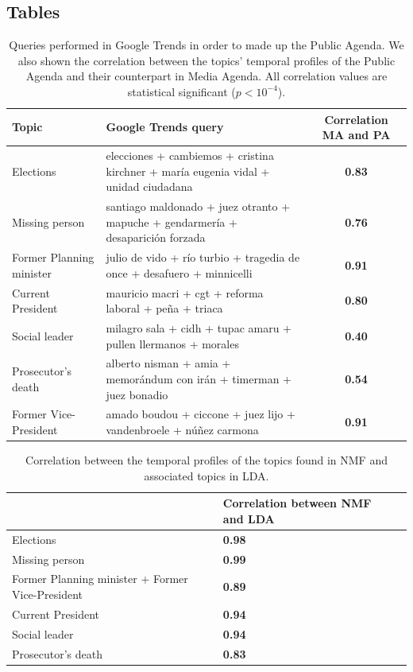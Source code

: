 \documentclass{bmcart}
\begin{document}
\begin{backmatter}
\section*{Tables}
\begin{table}[h!]
\caption{Queries performed in Google Trends in order to made up the Public Agenda.
We also shown the correlation between the topics' temporal profiles of the Public Agenda and their counterpart in Media Agenda.
All correlation values are statistical significant ($p < 10^{-4}$).}
\begin{tabular}{llc}
\hline
Topic & Google Trends query & Correlation MA and PA \\ \hline
Elections & elecciones + cambiemos + cristina kirchner + maría eugenia vidal + unidad ciudadana & \textbf{0.83} \\
Missing person & santiago maldonado + juez otranto + mapuche + gendarmería + desaparición forzada & \textbf{0.76} \\
Former Planning minister & julio de vido + río turbio + tragedia de once + desafuero + minnicelli & \textbf{0.91} \\
Current President & mauricio macri + cgt + reforma laboral + peña + triaca & \textbf{0.80} \\
Social leader & milagro sala + cidh + tupac amaru + pullen llermanos + morales & \textbf{0.40} \\
Prosecutor's death & alberto nisman + amia + memorándum con irán + timerman + juez bonadio & \textbf{0.54} \\
Former Vice-President & amado boudou + ciccone + juez lijo + vandenbroele + núñez carmona & \textbf{0.91} \\ \hline
\end{tabular}
\end{table}

\begin{table}[h!]
\caption{Correlation between the temporal profiles of the topics found in NMF and associated topics in LDA.}
\begin{tabular}{llc}
\hline
& Correlation between NMF and LDA \\
\hline
Elections & \textbf{0.98} \\
Missing person & \textbf{0.99} \\
Former Planning minister + Former Vice-President & \textbf{0.89} \\
Current President & \textbf{0.94} \\
Social leader & \textbf{0.94} \\
Prosecutor's death & \textbf{0.83} \\ \hline
\end{tabular}
\label{table:correlation_nmf_lda}
\end{table}






\end{backmatter}
\end{document}
